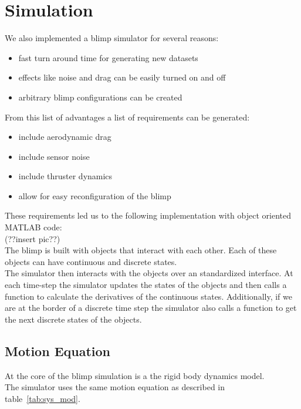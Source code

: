 \section{Simulation}
\label{sec:simulation}
We also implemented a blimp simulator for several reasons:
\begin{itemize}
\item fast turn around time for generating new datasets
\item effects like noise and drag can be easily turned on and off
\item arbitrary blimp configurations can be created
\end{itemize}
From this list of advantages a list of requirements can be generated:
\begin{itemize}
\item include aerodynamic drag
\item include sensor noise
\item include thruster dynamics
\item allow for easy reconfiguration of the blimp
\end{itemize}
These requirements led us to the following implementation with object oriented \textsc{MATLAB} code:\\
(??insert pic??)\\
The blimp is built with objects that interact with each other.
Each of these objects can have continuous and discrete states.\\
The simulator then interacts with the objects over an standardized interface.
At each time-step the simulator updates the states of the objects and then calls a function to calculate the derivatives of the continuous states.
Additionally, if we are at the border of a discrete time step the simulator also calls a function to get the next discrete states of the objects.\\

\subsection{Motion Equation}
\label{sub:motion_equation}
At the core of the blimp simulation is a the rigid body dynamics model. \\
The simulator uses the same motion equation as described in table~\ref{tab:sys_mod}.\\

